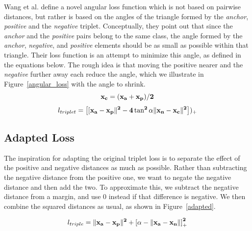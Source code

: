 Wang et al. \cite{DBLP:journals/corr/abs-1708-01682} define a novel
angular loss function which is not based on pairwise distances, but
rather is based on the angles of the triangle formed by the
\textit{anchor}, \textit{positive} and the \textit{negative} triplet.
Conceptually, they point out that since the \textit{anchor} and the
\textit{positive} pairs belong to the same class, the angle formed by
the \textit{anchor}, \textit{negative}, and \textit{positive} elements
should be as small as possible within that triangle.  Their loss
function is an attempt to minimize this angle, as defined in the
equations below.  The rough idea is that moving the positive nearer
and the \textit{negative} further away each reduce the angle, which we
illustrate in Figure~\ref{angular_loss} with the angle to shrink.
\begin{equation}
\bf{x_{c}} = (\bf{x_{a}} + \bf{x_{p}}) / 2
\end{equation}
\begin{equation}
l_{triplet} = \left[[\bf{x_{a}} - \bf{x_{p}}\|^2 - 4 \tan^2 \alpha \|\bf{x_{n}} - \bf{x_{c}}\|^2 \right])_{+}
\end{equation}

\subsection{Adapted Loss}

The inspiration for adapting the original triplet loss is to separate the effect of the positive
and negative distances as much as possible.  Rather than subtracting
the negative distance from the positive one, we want to negate the
negative distance and then add the two.  To approximate this, we
subtract the negative distance from a margin, and use 0 instead if
that difference is negative.  We then combine the squared distances as
usual, as shown in Figure~\ref{adapted}.

\begin{equation}
  l_{triple} =  \|\bf{x_a} - \bf{x_p}\|^2 + \left[ \alpha - \|\bf{x_a} -\bf{x_n}\| \right]_+^2
\label{adapted}
\end{equation}


